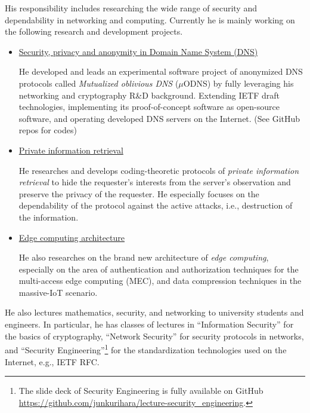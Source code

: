 \hspace*{4ex} His responsibility includes researching the wide range of security and dependability in networking and computing.
Currently he is mainly working on the following research and development projects.
\begin{itemize}
  \item \hspace*{4ex} \underline{Security, privacy and anonymity in Domain Name System (DNS)}\\[0.5ex]
    \hspace*{6ex}
    \begin{minipage}{0.9\linewidth}
      He developed and leads an experimental software project of anonymized DNS protocols called \textit{Mutualized oblivious DNS} ($\mu$ODNS) by fully leveraging his networking and cryptography R\&D background. Extending IETF draft technologies, implementing its proof-of-concept software as open-source software, and operating developed DNS servers on the Internet. (See GitHub repos for codes)
    \end{minipage}
  \item \hspace*{4ex} \underline{Private information retrieval}\\[0.5ex]
    \hspace*{6ex}
    \begin{minipage}{0.9\linewidth}
      He researches and develops coding-theoretic protocols of \emph{private information retrieval} to hide the requester's interests from the server's observation and preserve the privacy of the requester. He especially focuses on the dependability of the protocol against the active attacks, i.e., destruction of the information.
    \end{minipage}
  \item \hspace*{4ex} \underline{Edge computing architecture}\\[0.5ex]
    \hspace*{6ex}
    \begin{minipage}{0.9\linewidth}
      He also researches on the brand new architecture of \emph{edge computing}, especially on the area of authentication and authorization techniques for the multi-access edge computing (MEC), and data compression techniques in the massive-IoT scenario.
    \end{minipage}
\end{itemize}
He also lectures mathematics, security, and networking to university students and engineers.
In particular, he has classes of lectures in ``Information Security'' for the basics of cryptography, ``Network Security'' for security protocols in networks, and ``Security Engineering''\footnote{The slide deck of Security Engineering is fully available on GitHub \url{https://github.com/junkurihara/lecture-security_engineering}.} for the standardization technologies used on the Internet, e.g., IETF RFC.
\vspace*{2ex}

